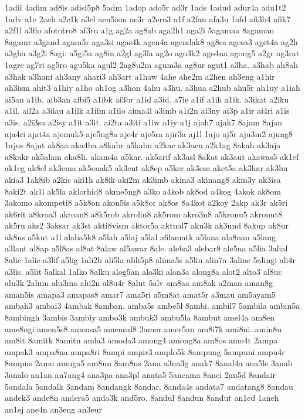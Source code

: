{1adil 4adim ad8is adisi5p8 5adm 1adop ado5r ad3r 1ads 1adud adur4a adu1t2
1adv a1e 2aeh a2e1k a3el aen5ism ae3r a2ero3 a1f a2fan afa3u 1afd afi3b4
afik7 a2f1l a3flo afototro8 af3ru a1g ag2a ag8ab aga2h1 aga2i 5agamaa
8agaman 8agamr a3gand agasa5r aga3si agas4k agen4a agendak8 ag8es agesa3
aget4a ag2h a3gha a3g2i 8agi. a5gi5a ag8in a2gl ag3la ag2o ago3k2 ago4na
agong5 a2gr ag3rat 1agre ag7ri ag5ro agu5ka agul2 2ag8u2m agum3a ag8ur
agut1 a3ha. a3hab ah8ah a3hak a3hani ah3any ahari3 ah3art a1haw 4ahe ahe2m
a2hen ah3eng a1hir ah3ism ahit3 a1hiy a1ho ah1og a3hon 4ahu a3hu. a3hua
a2hub ahu5r ah1uy a1iah ai5an a1ib. aib3an aibi5 a1ibk ai3br a1id a3id.
a7ie a1if a1ih a1ik. a3ikat a2iku a1il. ail2a a3ilau a1ilk a1ilm a1ilo
aima4l a3imb a1i2n ai3ny ai3p a1ir ai4ri a1is a3is. a2i3sa a2isy a1it
a3it. ai2ta a3iti a1iw a1iy a1j ajah7 ajak7 8ajam 8ajan aja4ri ajat4a
ajemuk5 aje5ng8a aje4r aje5ra ajir3a aj1l 1ajo aj5r aju3m2 ajung8 1ajus
8ajut ak8aa aka4ba a8kabr a5kabu a2kac ak3acu a2k1ag 8akah ak3aja a8kakr
ak5alam aka8li. akam4a a5kar. ak5arif ak3asl 8akat ak3aut akawas5 ak1ef
ak1eg ak8el ak3ema ak5enak5 ak3ent ak8ep a5ker ak3esa aket5a ak3har ak3hu
akia3 1ak8ib a2kic aki1h ak8ik aki2m ak3imb akina3 akinang8 akin3y ak3isa
8aki2t ak1l ak5la aklorhid8 akme5ng8 a3ko a4kob ak8od a4kog 4akok ak8om
3akomo akompeti8 a5k8on akon5is a5k8or ak8os 8a4kot a2koy 2akp ak3r ak5ri
ak6rit a8kroa3 akroan8 a8k5rob akrolin8 ak5rom akro3n8 a5kronu5 akronut8
ak5ru aks2 3aksar ak3st akti8vism aktor5a aktual7 aku3k ak3und 8akup ak8ur
ak8us a5kut a1l alaba5k8 a5lah a5laj a5lal a6lamatk a5lana ala8nan a5lang
a3lant al8ap a5l8as al8at 8alaw al5awar 8ale. aleba3 alebar8 ale5na a5lia
3alial 8alic 1alie a3lif a5lig 1ali2h ali5la alili5p8 alima5s a5lin alin7a
3aline 5alingi ali4r a3lis. a5lit 5alkal 1alko 8alku alog5an alo3ki alon3a
along8a alot2 alto3 al8uc alu3k 2alum alu3ma alu2n al8u4r 8alut 5alv am8aa
am8ak a2man aman8g aman5is amapa3 amapas8 amar7 ama5ri a5m8at amat5r a3mau
am5ayam5 ambah3 ambai3 4ambak 8amban. amba5s ambe5l 8ambi. ambil7 5ambila
ambin5a 8ambingh 3ambis 3ambiy ambo3k ambuk3 ambu5la 8ambut amel4a am8en
ame8ngi amen5s8 amensa5 amensal8 2amer amer5an am8i7k ami8ni. amin8u am8it
8amitk 8amitn amla3 amoda3 among4 among8a am8os amo4t 2ampa ampak3 ampa8na
ampa8ri 8ampi ampir3 amplo5k 8ampung 5ampuni ampu4r 8ampus 2amu amuga5
am8un 8am8us 2ana a3na3g anak7 8anal4a ana5le 3anali 3analo an1an an7ang4
ana3pa ana3pl anata5 5ancama 8anci 2an5d 8andair 5andala 5andalk 3andam
8andangk 8andar. 8anda4s andata7 andatang8 8andau andek3 ande8n andera5
ando3k and5ro. 8andul 8andun 8andut an1ed 1aneh an1ej ane4n an3eng an3eur
}

